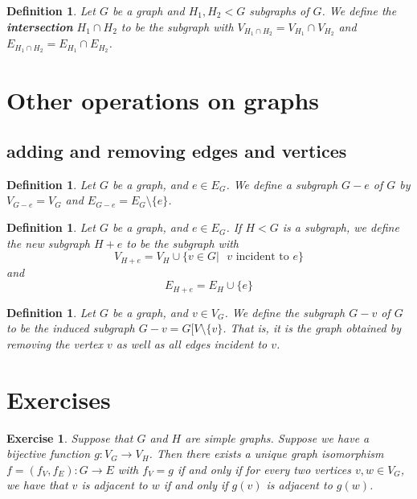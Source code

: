 \documentclass[12pt]{report}
\theoremstyle{plain}
\newtheorem{defn}[thm]{Definition}
\newtheorem{exercise}{Exercise}[section]
\begin{document}
\begin{defn} \label{intersection definition}
Let $G$ be a graph and $H_1, H_2 < G$ subgraphs of $G$. We define the
\textbf{intersection} $H_1 \cap
H_2$ to be the subgraph with $V_{H_1 \cap H_2} = V_{H_1} \cap V_{H_2}$ and
$E_{H_1 \cap H_2} = E_{H_1} \cap E_{H_2}$. 
\end{defn}

\section{Other operations on graphs}

\subsection{adding and removing edges and vertices}

\begin{defn}
Let $G$ be a graph, and $e \in E_G$. We define a subgraph $G - e$ of $G$ by
$V_{G - e} = V_G$ and $E_{G - e} = E_G \setminus \{e\}$.
\end{defn}

\begin{defn}
Let $G$ be a graph, and $e \in E_G$. If $H < G$ is a subgraph, we define
the new subgraph $H + e$ to be the subgraph with
\[V_{H + e} = V_H \cup \{v \in G | \text{ $v$ incident to $e$}\}\]
and
\[E_{H + e} = E_H \cup \{e\}\]
\end{defn}

\begin{defn}
Let $G$ be a graph, and $v \in V_G$. We define the subgraph $G - v$ of $G$
to be the induced subgraph $G - v = G[V \setminus \{v \}$. That is, it is
the graph obtained by removing the vertex $v$ as well as all edges incident
to $v$.
\end{defn}

\section{Exercises}

\begin{exercise}
Suppose that $G$ and $H$ are simple graphs. Suppose we have a bijective
function $g: V_G \to V_H$. Then there exists a unique graph isomorphism $f
= (f_V, f_E) : G \to E$ with $f_V = g$ if and only if for every two
vertices $v, w \in V_G$, we have that $v$ is adjacent to $w$ if and only if
$g(v)$ is adjacent to $g(w)$.
\end{exercise}
\end{document}
